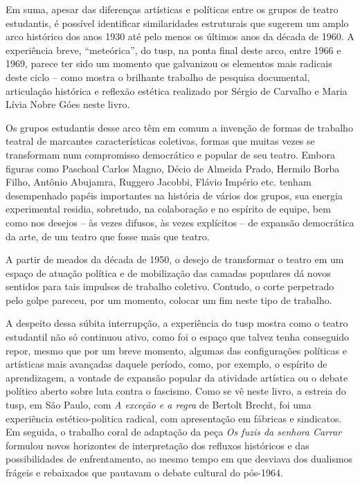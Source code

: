 \subject{Arco histórico}

Em suma, apesar das diferenças artísticas e políticas entre os grupos de
teatro estudantis, é possível identificar similaridades estruturais que
sugerem um amplo arco histórico dos anos 1930 até pelo menos os últimos
anos da década de 1960. A experiência breve, “meteórica”, do {\sc tusp}, na
ponta final deste arco, entre 1966 e 1969, parece ter sido um momento
que galvanizou os elementos mais radicais deste ciclo -- como mostra o
brilhante trabalho de pesquisa documental, articulação histórica e
reflexão estética realizado por Sérgio de Carvalho e Maria Lívia Nobre
Góes neste livro.

Os grupos estudantis desse arco têm em comum a invenção de formas de
trabalho teatral de marcantes características coletivas, formas que
muitas vezes se transformam num compromisso democrático e popular de seu
teatro. Embora figuras como Paschoal Carlos Magno, Décio de Almeida
Prado, Hermilo Borba Filho, Antônio Abujamra, Ruggero Jacobbi, Flávio
Império etc. tenham desempenhado papéis importantes na história de
vários dos grupos, sua energia experimental residia, sobretudo, na
colaboração e no espírito de equipe, bem como nos desejos -- às vezes
difusos, às vezes explícitos -- de expansão democrática da arte, de um
teatro que fosse mais que teatro.

A partir de meados da década de 1950, o desejo de transformar o teatro
em um espaço de atuação política e de mobilização das camadas populares
dá novos sentidos para tais impulsos de trabalho coletivo. Contudo, o
corte perpetrado pelo golpe pareceu, por um momento, colocar um fim
neste tipo de trabalho.

A despeito dessa súbita interrupção, a experiência do {\sc tusp} mostra como o
teatro estudantil não só continuou ativo, como foi o espaço que talvez
tenha conseguido repor, mesmo que por um breve momento, algumas das
configurações políticas e artísticas mais avançadas daquele período,
como, por exemplo, o espírito de aprendizagem, a vontade de expansão
popular da atividade artística ou o debate político aberto sobre luta
contra o fascismo. Como se vê neste livro, a estreia do {\sc tusp}, em São
Paulo, com {\it A exceção e a regra} de Bertolt Brecht, foi uma
experiência estético-politica radical, com apresentação em fábricas e
sindicatos. Em seguida, o trabalho coral de adaptação da peça {\it Os
fuzis da senhora Carrar} formulou novos horizontes de interpretação dos
refluxos históricos e das possibilidades de enfrentamento, ao mesmo
tempo em que desviava dos dualismos frágeis e rebaixados que pautavam o
debate cultural do pós-1964.

